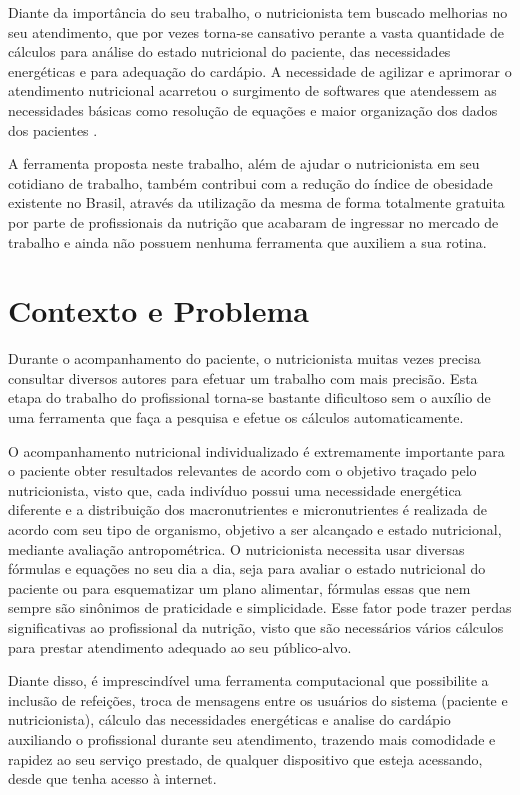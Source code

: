 \documentclass[
	12pt,				%
    oneside,			%
	a4paper,			%
	english,			%
	french,				%
	spanish,			%
	brazil,				%
	]{abntex2}
\begin{document}
Diante da importância do seu trabalho, o nutricionista tem buscado melhorias
no seu atendimento, que por vezes torna-se cansativo perante a vasta quantidade de
cálculos para análise do estado nutricional do paciente, das necessidades energéticas
e para adequação do cardápio. A necessidade de agilizar e aprimorar o atendimento
nutricional acarretou o surgimento de softwares que atendessem as necessidades
básicas como resolução de equações e maior organização dos dados dos pacientes
\cite{vieira}.

A ferramenta proposta neste trabalho, além de ajudar o nutricionista em seu cotidiano de trabalho,
também contribui com a redução do índice de obesidade existente no Brasil, através da utilização da mesma
de forma totalmente gratuita por parte de profissionais da nutrição que acabaram de ingressar no mercado
de trabalho e ainda não possuem nenhuma ferramenta que auxiliem a sua rotina.


\section{Contexto e Problema}

Durante o acompanhamento do paciente, o nutricionista muitas vezes precisa
consultar diversos autores para efetuar um trabalho com mais precisão. Esta etapa do trabalho do profissional
torna-se bastante dificultoso sem o auxílio de uma ferramenta que faça a pesquisa e efetue os cálculos automaticamente.

O acompanhamento nutricional individualizado é extremamente importante para
o paciente obter resultados relevantes de acordo com o objetivo traçado pelo
nutricionista, visto que, cada indivíduo possui uma necessidade energética diferente
e a distribuição dos macronutrientes e micronutrientes é realizada de acordo com seu
tipo de organismo, objetivo a ser alcançado e estado nutricional, mediante avaliação
antropométrica.
O nutricionista necessita usar diversas fórmulas
e equações no seu dia a dia, seja para avaliar o estado nutricional do
paciente ou para esquematizar um plano alimentar, fórmulas essas que nem sempre
são sinônimos de praticidade e simplicidade. Esse fator pode trazer perdas
significativas ao profissional da nutrição, visto que são necessários vários cálculos
para prestar atendimento adequado ao seu público-alvo.

Diante disso, é imprescindível uma ferramenta computacional que possibilite a inclusão de refeições, troca de mensagens entre
os usuários do sistema (paciente e nutricionista), 
cálculo das necessidades energéticas e analise do
cardápio auxiliando o profissional durante seu atendimento, trazendo mais
comodidade e rapidez ao seu serviço prestado, de qualquer dispositivo que esteja acessando, desde
que tenha acesso à internet.
\end{document}
